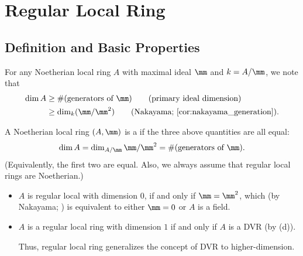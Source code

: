 \section{Regular Local Ring}
\subsection{Definition and Basic Properties}
For any Noetherian local ring $A$ with maximal ideal $\mm$
and $k=A/\mm$, we note that
\begin{align*}
    \dim A &\geq \#(\text{generators of }\mm) 
    \tag{primary ideal dimension} \\
    &\geq \dim_k(\mm/\mm^2)
    \tag{Nakayama; \Cref{cor:nakayama_generation}}.
\end{align*}
\begin{definition}
    A Noetherian local ring $(A,\mm)$ 
    is a  if the three above
    quantities are all equal:
    $$\dim A = \dim_{A/\mm} \mm/\mm^2
    = \#(\text{generators of }\mm).$$
    (Equivalently, the first two are equal.
    Also, we always assume that regular local rings
    are Noetherian.)
\end{definition}
\begin{example}
\begin{itemize}
    \item $A$ is regular local with dimension $0$,
    if and only if $\mm=\mm^2$,
    which (by Nakayama; )
    is equivalent to either $\mm=0$ or $A$ is a field.
    \item $A$ is a regular local ring with dimension 
    $1$ if and only if $A$ is a DVR 
    (by  (d)).

    Thus, regular local ring generalizes the concept
    of DVR to higher-dimension.
\end{itemize}
\end{example}
